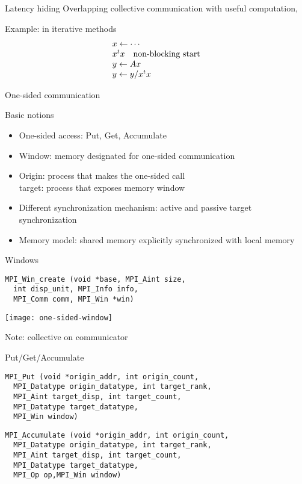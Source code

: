 \begin{frame}{Latency hiding}
Overlapping collective communication with useful computation,

Example: in iterative methods
\[ 
\begin{array}{l}
x\leftarrow\cdots\\
x^tx\quad\hbox{non-blocking start}\\
y\leftarrow Ax\\
y\leftarrow y/x^tx
\end{array}
\]
\end{frame}

 {One-sided communication}

\begin{frame}[fragile]{Basic notions}
\begin{itemize}
\item One-sided access: Put, Get, Accumulate
\item Window: memory designated for one-sided communication
\item Origin: process that makes the one-sided call\\
  target: process that exposes memory window
\item Different synchronization mechanism: active and passive target synchronization
\item Memory model: shared memory explicitly synchronized with local memory
\end{itemize}
\end{frame}

\begin{frame}[fragile]{Windows}
\small
\begin{verbatim}
MPI_Win_create (void *base, MPI_Aint size, 
  int disp_unit, MPI_Info info, 
  MPI_Comm comm, MPI_Win *win)
\end{verbatim}
  \texttt{[image: one-sided-window]}

Note: collective on communicator
\end{frame}

\begin{frame}[fragile]{Put/Get/Accumulate}
\small
\begin{verbatim}
MPI_Put (void *origin_addr, int origin_count, 
  MPI_Datatype origin_datatype, int target_rank,
  MPI_Aint target_disp, int target_count, 
  MPI_Datatype target_datatype,
  MPI_Win window)
\end{verbatim}
\begin{verbatim}
MPI_Accumulate (void *origin_addr, int origin_count, 
  MPI_Datatype origin_datatype, int target_rank,
  MPI_Aint target_disp, int target_count, 
  MPI_Datatype target_datatype,
  MPI_Op op,MPI_Win window)
\end{verbatim}
\end{frame}

